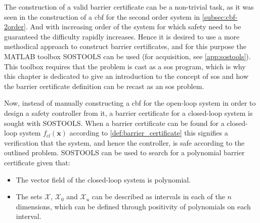 The construction of a valid barrier certificate can be a non-trivial task, as it was seen in the construction of a \gls{cbf} for the second order system in \autoref{subsec:cbf-2order}. And with increasing order of the system for which safety need to be guaranteed the difficulty rapidly increases. Hence it is desired to use a more methodical approach to construct barrier certificates, and for this purpose the MATLAB toolbox SOSTOOLS can be used \citep{bib:prajna_framework} (for acquisition, see \autoref{app:sostools}). This toolbox requires that the problem is cast as a \gls{sos} program, which is why this chapter is dedicated to give an introduction to the concept of \gls{sos} and how the barrier certificate definition can be recast as an \gls{sos} problem.

Now, instead of manually constructing a \gls{cbf} for the open-loop system in order to design a safety controller from it, a barrier certificate for a closed-loop system is sought with SOSTOOLS.
When a barrier certificate can be found for a closed-loop system $f_{cl}(\textbf{x})$ according to \autoref{def:barrier_certificate} this signifies a verification that the system, and hence the controller, is safe according to the outlined problem. 
SOSTOOLS can be used to search for a polynomial barrier certificate given that: \citep{bib:prajna_framework}
\vspace{-2mm}
\begin{itemize}
	\itemsep-0.5mm
\item The vector field of the closed-loop system is polynomial.
\item The sets $\mathcal{X}$, $\mathcal{X}_0$ and $\mathcal{X}_u$ can be described as intervals in each of the $n$ dimensions, which can be defined through positivity of polynomials on each interval.
\end{itemize}

